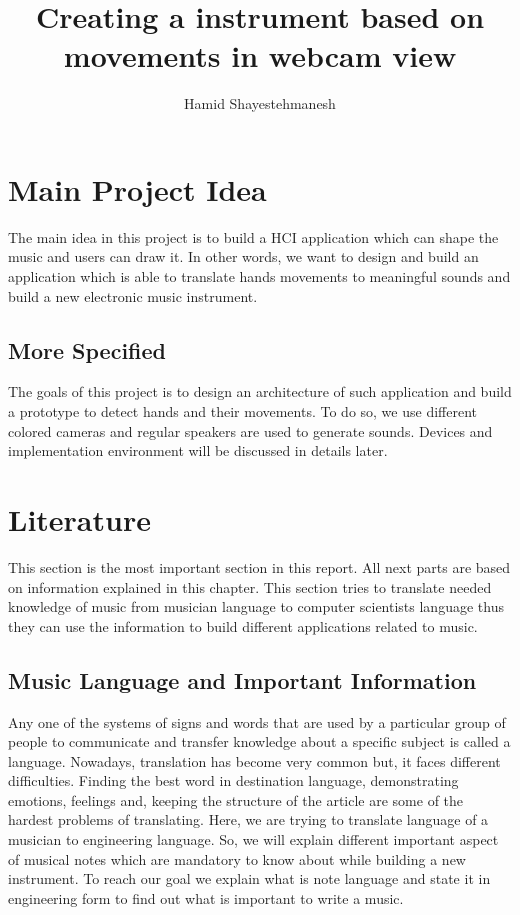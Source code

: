 \documentclass{report}
\begin{document}
\author{Hamid Shayestehmanesh}
\title{Creating a instrument based on movements in webcam view}
\maketitle
\tableofcontents
\newpage

\section{Main Project Idea}

The main idea in this project is to build a HCI application which can shape the music and users can draw it. In other words, we want to design and build an application which is able to translate hands movements to meaningful sounds and build a new electronic music instrument.
\subsection{More Specified}
The goals of this project is to design an architecture of such application and build a prototype to detect hands and their movements. To do so, we use different colored cameras and regular speakers are used to generate sounds. Devices and implementation environment will be discussed in details later.
\pagebreak


\section{Literature}
This section is the most important section in this report. All next parts are based on information explained in this chapter. This section tries to translate needed knowledge of music from musician language to computer scientists language thus they can use the information to build different applications related to music.
\subsection{Music Language and Important Information}
Any one of the systems of signs and words that are used by a particular group of people to communicate and transfer knowledge about a specific subject is called a language\citep{Lang}. Nowadays, translation has become very common but, it faces different difficulties. Finding the best word in destination language, demonstrating emotions, feelings and, keeping the structure of the article are some of the hardest problems of translating. Here, we are trying to translate language of a musician to engineering language. So, we will explain different important aspect of musical notes which are mandatory to know about while building a new instrument. To reach our goal we explain what is note language and state it in engineering form to find out what is important to write a music. 
\end{document}
